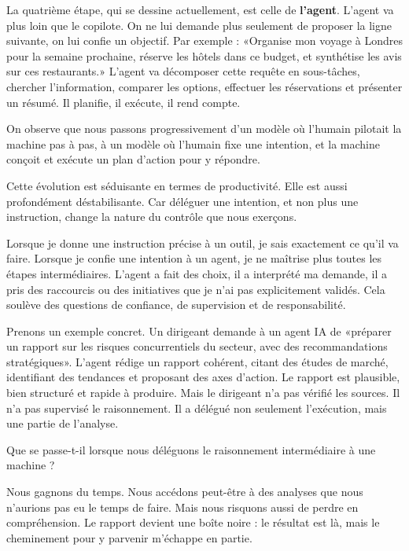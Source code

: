 La quatrième étape, qui se dessine actuellement, est celle de \textbf{l'agent}. L'agent va plus loin que le copilote. On ne lui demande plus seulement de proposer la ligne suivante, on lui confie un objectif. Par exemple : «Organise mon voyage à Londres pour la semaine prochaine, réserve les hôtels dans ce budget, et synthétise les avis sur ces restaurants.» L'agent va décomposer cette requête en sous-tâches, chercher l'information, comparer les options, effectuer les réservations et présenter un résumé. Il planifie, il exécute, il rend compte.

On observe que nous passons progressivement d'un modèle où l'humain pilotait la machine pas à pas, à un modèle où l'humain fixe une intention, et la machine conçoit et exécute un plan d'action pour y répondre.

Cette évolution est séduisante en termes de productivité. Elle est aussi profondément déstabilisante. Car déléguer une intention, et non plus une instruction, change la nature du contrôle que nous exerçons.

Lorsque je donne une instruction précise à un outil, je sais exactement ce qu'il va faire. Lorsque je confie une intention à un agent, je ne maîtrise plus toutes les étapes intermédiaires. L'agent a fait des choix, il a interprété ma demande, il a pris des raccourcis ou des initiatives que je n'ai pas explicitement validés. Cela soulève des questions de confiance, de supervision et de responsabilité.

Prenons un exemple concret. Un dirigeant demande à un agent IA de «préparer un rapport sur les risques concurrentiels du secteur, avec des recommandations stratégiques». L'agent rédige un rapport cohérent, citant des études de marché, identifiant des tendances et proposant des axes d'action. Le rapport est plausible, bien structuré et rapide à produire. Mais le dirigeant n'a pas vérifié les sources. Il n'a pas supervisé le raisonnement. Il a délégué non seulement l'exécution, mais une partie de l'analyse.

\begin{aiquote}
Que se passe-t-il lorsque nous déléguons le raisonnement intermédiaire à une machine ?
\end{aiquote}

Nous gagnons du temps. Nous accédons peut-être à des analyses que nous n'aurions pas eu le temps de faire. Mais nous risquons aussi de perdre en compréhension. Le rapport devient une boîte noire : le résultat est là, mais le cheminement pour y parvenir m'échappe en partie.

